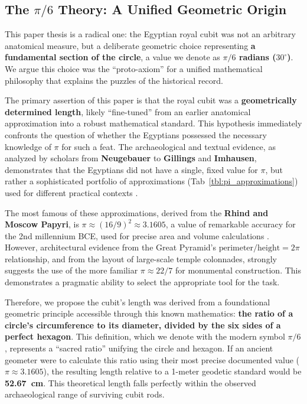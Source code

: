 \documentclass[11pt]{article}
\begin{document}
\subsection{The \texorpdfstring{$\pi/6$}{pi/6} Theory: A Unified Geometric Origin}

This paper thesis is a radical one: the Egyptian royal cubit was not an arbitrary anatomical measure, but a deliberate geometric choice representing \textbf{a fundamental section of the circle}, a value we denote as \textbf{$\pi/6$ radians ($30^\circ$)}. We argue this choice was the ``proto-axiom'' for a unified mathematical philosophy that explains the puzzles of the historical record.

The primary assertion of this paper is that the royal cubit was a \textbf{geometrically determined length}, likely ``fine-tuned'' from an earlier anatomical approximation into a robust mathematical standard. This hypothesis immediately confronts the question of whether the Egyptians possessed the necessary knowledge of $\pi$ for such a feat. The archaeological and textual evidence, as analyzed by scholars from \textbf{Neugebauer} to \textbf{Gillings} and \textbf{Imhausen}, demonstrates that the Egyptians did not have a single, fixed value for $\pi$, but rather a sophisticated portfolio of approximations (Tab~\ref{tbl:pi_approximations}) used for different practical contexts \cite{gillings1982mathematics, imhausen2016mathematics}.

The most famous of these approximations, derived from the \textbf{Rhind and Moscow Papyri}, is $\pi \approx (16/9)^2 \approx 3.1605$, a value of remarkable accuracy for the 2nd millennium BCE, used for precise area and volume calculations \cite{clagett1999ancient}. However, architectural evidence from the Great Pyramid's $\text{perimeter}/\text{height} = 2\pi$ relationship, and from the layout of large-scale temple colonnades, strongly suggests the use of the more familiar $\pi \approx 22/7$ for monumental construction. This demonstrates a pragmatic ability to select the appropriate tool for the task.

Therefore, we propose the cubit's length was derived from a foundational geometric principle accessible through this known mathematics: \textbf{the ratio of a circle's circumference to its diameter, divided by the six sides of a perfect hexagon}. This definition, which we denote with the modern symbol $\pi/6$, represents a ``sacred ratio'' unifying the circle and hexagon. If an ancient geometer were to calculate this ratio using their most precise documented value ($\pi \approx 3.1605$), the resulting length relative to a 1-meter geodetic standard would be \textbf{\SI{52.67}{\centi\meter}}. This theoretical length falls perfectly within the observed archaeological range of surviving cubit rods. 
\end{document}
